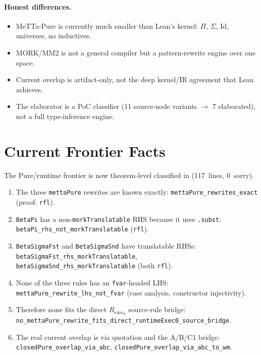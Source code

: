 \documentclass[11pt]{article}
\theoremstyle{remark}
\newcommand{\MeTTa}{\textup{MeTTa}}
\newcommand{\MORK}{\textup{MORK}}
\newcommand{\code}[1]{\texttt{#1}}
\newcommand{\codepath}[1]{\path{#1}}
\newcommand{\leanref}[1]{\texttt{#1}}
\begin{document}
\paragraph{Honest differences.}
\begin{itemize}
  \item \MeTTa-Pure is currently much smaller than Lean's kernel:
  $\Pi$, $\Sigma$, Id, universes, no inductives.
  \item \MORK{}/MM2 is not a general compiler but a pattern-rewrite engine
  over one space.
  \item Current overlap is artifact-only, not the deep kernel/IR agreement
  that Lean achieves.
  \item The elaborator is a PoC classifier (11 source-node variants $\to$ 7 elaborated),
  not a full type-inference engine.
\end{itemize}

\section{Current Frontier Facts}
\label{sec:frontier}

The Pure/runtime frontier is now theorem-level classified in
\codepath{PureRuntimeFrontier.lean} (117~lines, 0~sorry).

\begin{enumerate}
  \item The three \code{mettaPure} rewrites are known exactly:
  \leanref{mettaPure\_rewrites\_exact} (proof: \code{rfl}).

  \item \code{BetaPi} has a non-\leanref{morkTranslatable} RHS because it
  uses \code{.subst}:
  \leanref{betaPi\_rhs\_not\_morkTranslatable} (\code{rfl}).

  \item \code{BetaSigmaFst} and \code{BetaSigmaSnd} have translatable RHSs:
  \leanref{betaSigmaFst\_rhs\_morkTranslatable},
  \leanref{betaSigmaSnd\_rhs\_morkTranslatable} (both \code{rfl}).

  \item None of the three rules has an \code{fvar}-headed LHS:
  \leanref{mettaPure\_rewrite\_lhs\_not\_fvar}
  (case analysis, constructor injectivity).

  \item Therefore none fits the direct $R_{\mathrm{exec}_0}$ source-rule
  bridge:
  \leanref{no\_mettaPure\_rewrite\_fits\_direct\_runtimeExec0\_source\_bridge}.

  \item The real current overlap is via quotation and the A/B/C1 bridge:
  \leanref{closedPure\_overlap\_via\_abc},
  \leanref{closedPure\_overlap\_via\_abc\_to\_wm}.
\end{enumerate}
\end{document}
